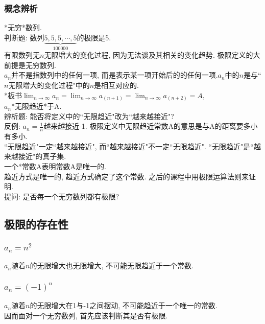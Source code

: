 \documentclass{article}
\begin{document}
\begin{CJK}{UTF8}{gkai}
\subsubsection{概念辨析}
*无穷*数列.\\
判断题: 数列$\underbrace{5, 5, 5, \cdots, 5}_{100000}$的极限是5.\\
有限数列无$n$无限增大的变化过程, 因为无法谈及其相关的变化趋势. 极限定义的大前提是无穷数列.\\
\newline$a_n$并不是指数列中的任何一项, 而是表示某一项开始后的的任何一项.$a_n$中的$n$是与``$n$无限增大的变化过程"中的$n$是相互对应的.\\
*板书$\lim_{n \to \infty}{a_n} =  \lim_{n \to \infty}{a_(n+1) } = \lim_{n \to \infty}{a_(n+2)} = A,$\\
\newline$a_n$*无限趋近*于A.\\
辨析题:  能否将定义中的``无限趋近"改为``越来越接近"?\\
反例: $a_n = \frac{1}{n}$越来越接近-1. 极限定义中无限趋近常数A的意思是与A的距离要多小有多小.\\
``无限趋近"一定``越来越接近", 而``越来越接近"不一定``无限趋近". ``无限趋近"是``越来越接近"的真子集.\\
\newline*一个*常数A表明常数A是唯一的.\\
趋近方式是唯一的, 趋近方式确定了这个常数. 之后的课程中用极限运算法则来证明.\\
\newline*提问: 是否每一个无穷数列都有极限?\\

\subsection{极限的存在性}
\subsubsection{$a_n = n^2$}
$a_n$随着$n$的无限增大也无限增大, 不可能无限趋近于一个常数.\\
\subsubsection{$a_n = (-1)^n$}
$a_n$随着$n$的无限增大在1与-1之间摆动, 不可能趋近于一个唯一的常数.\\
\newline
因而面对一个无穷数列, 首先应该判断其是否有极限.


\end{CJK}
\end{document}
